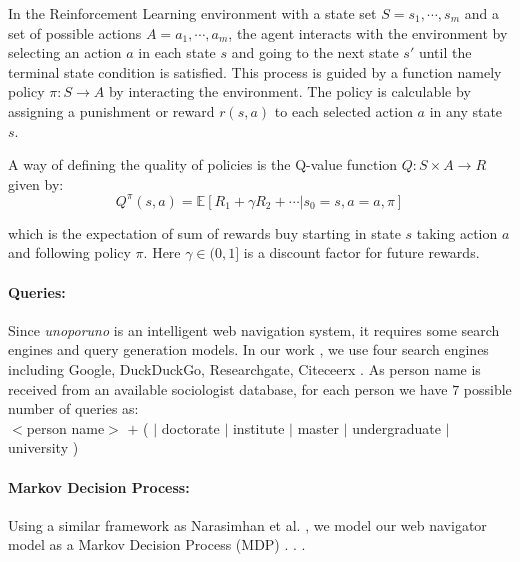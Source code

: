 In the Reinforcement Learning environment with a state set $S = s_1, \cdots, s_m$ and a  set of possible actions $A = a_1, \cdots, a_m$, the agent interacts with the environment by selecting an action $a$ in each state $s$ and going to the next state $s'$ until the terminal state condition is satisfied. This process is guided by a function namely policy $\pi : S \longrightarrow A$ by interacting the environment. The policy is calculable by assigning a punishment or reward $r(s, a)$ to each selected action $a$ in any state $s$.  

A way of defining the quality of policies is the Q-value function $Q : S \times A \longrightarrow R$ given by: 
$$Q^{\pi}(s, a) = \mathbb{E}[R_1+ \gamma R_2 + \cdots | s_0 = s, a =a, \pi]$$

which is the expectation of sum of rewards buy starting in state $s$ taking action $a$ and following policy $\pi$. Here $\gamma \in (0, 1]$ is a discount factor for future rewards.

\paragraph{Queries: }  Since \textit{unoporuno} is an intelligent web navigation system, it requires some search engines and query generation models. In our work , we use four search engines including Google, DuckDuckGo, Researchgate, Citeceerx  . As person name is received from an available sociologist database, for each person we have $7$ possible number of queries as: \\

$<$person name$>$ $+$ (  $|$ doctorate $|$ institute $|$ master $|$ undergraduate $|$ university ) 

\paragraph{Markov Decision Process: } Using a similar framework as Narasimhan et al. , we model our web navigator model as a Markov Decision Process (MDP) \cite{puterman1994}. . .


